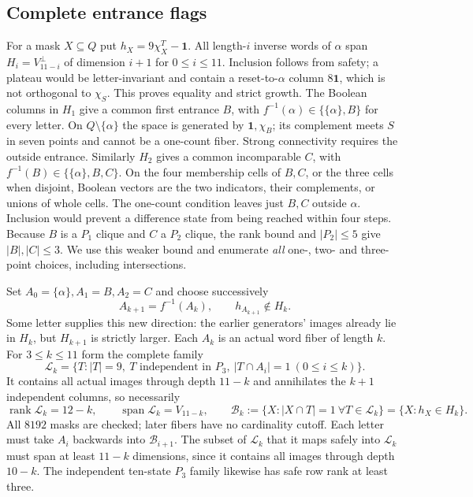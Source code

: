 \documentclass[10pt]{article}
\newcommand{\one}{\mathbf 1}
\begin{document}
\subsection{Complete entrance flags}
For a mask $X\subseteq Q$ put $h_X=9\chi_X^T-\one$.
All length-$i$ inverse words of $\alpha$ span
$H_i=V_{11-i}^{\perp}$ of dimension $i+1$ for $0\le i\le11$.
Inclusion follows from safety; a plateau would be letter-invariant and
contain a reset-to-$\alpha$ column $8\one$, which is not orthogonal to
$\chi_S$. This proves equality and strict growth.
The Boolean columns in $H_1$ give a common first entrance $B$, with
$f^{-1}(\alpha)\in\{\{\alpha\},B\}$ for every letter.
On $Q\setminus\{\alpha\}$ the space is generated by $\one,\chi_B$;
its complement meets $S$ in seven points and cannot be a one-count fiber.
Strong connectivity requires the outside entrance. Similarly $H_2$ gives
a common incomparable $C$, with
$f^{-1}(B)\in\{\{\alpha\},B,C\}$. On the four membership cells of
$B,C$, or the three cells when disjoint, Boolean vectors are the two
indicators, their complements, or unions of whole cells. The one-count
condition leaves just $B,C$ outside $\alpha$. Inclusion would prevent
a difference state from being reached within four steps.
Because $B$ is a $P_1$ clique and $C$ a $P_2$ clique, the rank bound and
$|P_2|\le5$ give $|B|,|C|\le3$. We use this weaker bound and enumerate
\emph{all} one-, two- and three-point choices, including intersections.

Set $A_0=\{\alpha\},A_1=B,A_2=C$ and choose successively
\[
 A_{k+1}=f^{-1}(A_k),\qquad h_{A_{k+1}}\notin H_k.
\]
Some letter supplies this new direction: the earlier generators' images
already lie in $H_k$, but $H_{k+1}$ is strictly larger. Each $A_k$ is an
actual word fiber of length $k$. For $3\le k\le11$ form the complete family
\[
 \mathcal L_k=\{T:|T|=9,\ T\text{ independent in }P_3,
                   \ |T\cap A_i|=1\ (0\le i\le k)\}.
\]
It contains all actual images through depth $11-k$ and annihilates the
$k+1$ independent columns, so necessarily
\begin{equation}\label{eq:eleven-family}
 \operatorname{rank}\mathcal L_k=12-k,\qquad
 \operatorname{span}\mathcal L_k=V_{11-k},\qquad
 \mathcal B_k:=\{X:|X\cap T|=1\ \forall T\in\mathcal L_k\}
              =\{X:h_X\in H_k\}.
\end{equation}
All $8192$ masks are checked; later fibers have no cardinality cutoff.
Each letter must take $A_i$ backwards into $\mathcal B_{i+1}$.
The subset of $\mathcal L_k$ that it maps safely into $\mathcal L_k$
must span at least $11-k$ dimensions, since it contains all images through
depth $10-k$. The independent ten-state $P_3$ family likewise has safe
row rank at least three.
\end{document}
